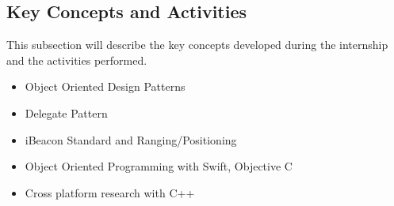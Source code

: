 \subsection{Key Concepts and Activities}
This subsection will describe the key concepts developed during the internship and the activities performed.

\begin{itemize}
	\item Object Oriented Design Patterns
	\item Delegate Pattern
	\item iBeacon Standard and Ranging/Positioning
	\item Object Oriented Programming with Swift, Objective C
	\item Cross platform research with C++ 
\end{itemize}